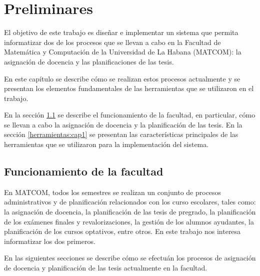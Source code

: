 \chapter{Preliminares}\label{chapter:preliminaries}
El objetivo de este trabajo es diseñar e implementar un sistema que 
permita informatizar dos de los procesos que se llevan a cabo en la Facultad
de Matemática y Computación de la Universidad de La Habana (MATCOM): 
la asignación de docencia y las planificaciones de las tesis.

En este capítulo se describe cómo se realizan estos procesos actualmente 
y se presentan los elementos fundamentales de las herramientas que se utilizaron 
en el trabajo.

En la sección \ref{section:funcionamiento de la facultad} se describe 
el funcionamiento de la facultad, en particular, cómo se llevan a cabo la 
asignación de docencia y la planificación de las tesis. En la sección 
\ref{herramientas:cap1} se presentan las características principales de las 
herramientas que se utilizaron para la implementación del sistema.





\section{Funcionamiento de la facultad}\label{section:funcionamiento de la facultad}
En MATCOM, todos los semestres se realizan 
un conjunto de procesos administrativos y de planificación relacionados con
los curso escolares, tales como:
la asignación de docencia, la planificación de las tesis de pregrado,
la planificación de los exámenes finales y 
revalorizaciones, la gestión de los alumnos ayudantes, la planificación de los cursos 
optativos, entre otros. En este trabajo nos interesa informatizar los dos primeros.

En las siguientes secciones se describe cómo se efectuán
los procesos de asignación de docencia y planificación de las tesis
actualmente en la facultad.




